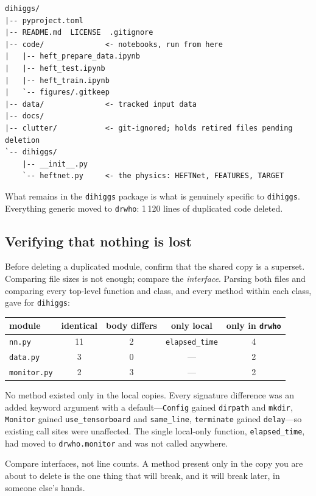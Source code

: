 \documentclass[11pt,a4paper]{article}
\newcommand{\pkg}[1]{\texttt{#1}}
\begin{document}
\begin{lstlisting}[style=plain]
dihiggs/
|-- pyproject.toml
|-- README.md  LICENSE  .gitignore
|-- code/              <- notebooks, run from here
|   |-- heft_prepare_data.ipynb
|   |-- heft_test.ipynb
|   |-- heft_train.ipynb
|   `-- figures/.gitkeep
|-- data/              <- tracked input data
|-- docs/
|-- clutter/           <- git-ignored; holds retired files pending deletion
`-- dihiggs/
    |-- __init__.py
    `-- heftnet.py     <- the physics: HEFTNet, FEATURES, TARGET
\end{lstlisting}

What remains in the \pkg{dihiggs} package is what is genuinely specific to
\pkg{dihiggs}. Everything generic moved to \pkg{drwho}: 1\,120 lines of
duplicated code deleted.

\subsection{Verifying that nothing is lost}

Before deleting a duplicated module, confirm that the shared copy is a superset.
Comparing file sizes is not enough; compare the \emph{interface}. Parsing both
files and comparing every top-level function and class, and every method within
each class, gave for \pkg{dihiggs}:

\begin{center}
\small
\begin{tabular}{lcccc}
\toprule
module & identical & body differs & only local & only in \pkg{drwho} \\
\midrule
\texttt{nn.py}      & 11 & 2 & \texttt{elapsed\_time} & 4 \\
\texttt{data.py}    &  3 & 0 & --- & 2 \\
\texttt{monitor.py} &  2 & 3 & --- & 2 \\
\bottomrule
\end{tabular}
\end{center}

No method existed only in the local copies. Every signature difference was an
added keyword argument with a default---\texttt{Config} gained
\texttt{dirpath} and \texttt{mkdir}, \texttt{Monitor} gained
\texttt{use\_tensorboard} and \texttt{same\_line}, \texttt{terminate} gained
\texttt{delay}---so existing call sites were unaffected. The single local-only
function, \texttt{elapsed\_time}, had moved to \texttt{drwho.monitor} and was
not called anywhere.

\begin{rulebox}
Compare interfaces, not line counts. A method present only in the copy you are
about to delete is the one thing that will break, and it will break later,
in someone else's hands.
\end{rulebox}
\end{document}
